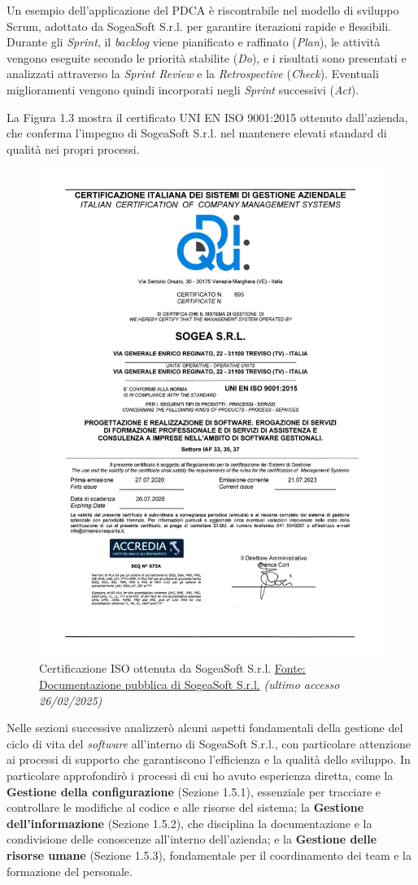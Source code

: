     \noindent Un esempio dell’applicazione del PDCA è riscontrabile nel modello di sviluppo Scrum, adottato da SogeaSoft S.r.l. per garantire iterazioni rapide e flessibili. Durante gli \textit{Sprint}, il \textit{backlog} viene pianificato e raffinato (\textit{Plan}), le attività vengono eseguite secondo le priorità stabilite (\textit{Do}), e i risultati sono presentati e analizzati attraverso la \textit{Sprint Review} e la \textit{Retrospective} (\textit{Check}). Eventuali miglioramenti vengono quindi incorporati negli \textit{Sprint} successivi (\textit{Act}).
    
    \noindent La Figura 1.3 mostra il certificato UNI EN ISO 9001:2015 ottenuto dall’azienda, che conferma l’impegno di SogeaSoft S.r.l. nel mantenere elevati standard di qualità nei propri processi.

    \begin{figure}[H]
        \centering
        \includegraphics[width=0.5\linewidth]{BCS-Tessi/images/CertificatoSogea.jpg}
        \caption[Certificazione ISO di SogeaSoft S.r.l.]{Certificazione ISO ottenuta da SogeaSoft S.r.l. \href{https://sogeasoft.com/p/iso9001}{Fonte: Documentazione pubblica di SogeaSoft S.r.l.}
        \textit{(ultimo accesso 26/02/2025)}}
        \label{fig:certificazione-iso}
    \end{figure}

    \noindent Nelle sezioni successive analizzerò alcuni aspetti fondamentali della gestione del ciclo di vita del \textit{software} all'interno di SogeaSoft S.r.l., con particolare attenzione ai processi di supporto che garantiscono l'efficienza e la qualità dello sviluppo. In particolare approfondirò i processi di cui ho avuto esperienza diretta, come la \textbf{Gestione della configurazione} (Sezione 1.5.1), essenziale per tracciare e controllare le modifiche al codice e alle risorse del sistema; la \textbf{Gestione dell’informazione} (Sezione 1.5.2), che disciplina la documentazione e la condivisione delle conoscenze all'interno dell'azienda; e la \textbf{Gestione delle risorse umane} (Sezione 1.5.3), fondamentale per il coordinamento dei team e la formazione del personale. 
    
